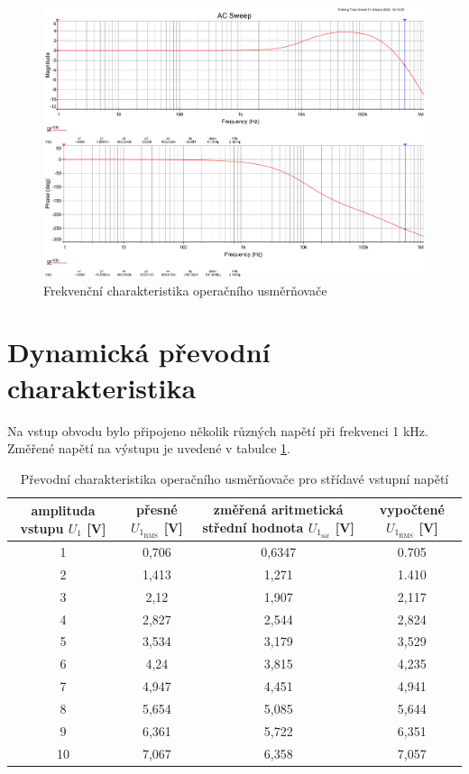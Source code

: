 \documentclass[twoside]{article}
\begin{document}
\begin{figure}[h!]
    \centering
    \includegraphics[width=0.8\linewidth]{frek_char.pdf}
    \caption{Frekvenční charakteristika operačního usměrňovače}
    \label{fig:bode}
\end{figure}

\section{Dynamická převodní charakteristika}

Na vstup obvodu bylo připojeno několik různých napětí při frekvenci 1 \si{\kilo\hertz}.
Změřené napětí na výstupu je uvedené v tabulce \ref{tab:prevod_char}.

\begin{table}
    \centering\begin{tabular}{c|c|c|c}
        amplituda vstupu $U_1$ [\si{\volt}] & přesné $U_{1_\text{RMS}}$ [\si{\volt}] & změřená aritmetická střední hodnota $U_{1_\text{sar}}$ [\si{\volt}] & vypočtené $U_{1_\text{RMS}}$ [\si{\volt}] \\ \hline
        1 & 0,706 & 0,6347 & 0.705 \\
        2 & 1,413 & 1,271 & 1.410 \\
        3 & 2,12 & 1,907 & 2,117 \\
        4 & 2,827 & 2,544 & 2,824 \\
        5 & 3,534 & 3,179 & 3,529 \\
        6 & 4,24 & 3,815 & 4,235 \\
        7 & 4,947 & 4,451 & 4,941 \\
        8 & 5,654 & 5,085 & 5,644 \\
        9 & 6,361 & 5,722 & 6,351 \\
        10 & 7,067 & 6,358 & 7,057
    \end{tabular}
    \caption{Převodní charakteristika operačního usměrňovače pro střídavé vstupní napětí}
    \label{tab:prevod_char}
\end{table}
\end{document}
